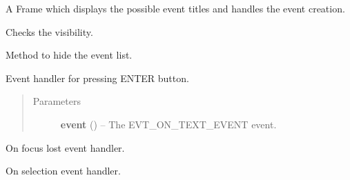\documentclass[letterpaper,10pt,english]{sphinxmanual}
\begin{document}
\begin{fulllineitems}
\label{diwacs:diwacs.EventList}
A Frame which displays the possible event titles and handles the event
creation.

\begin{fulllineitems}
\label{diwacs:diwacs.EventList.CheckVisibility}
Checks the visibility.

\end{fulllineitems}


\begin{fulllineitems}
\label{diwacs:diwacs.EventList.HideNow}
Method to hide the event list.

\end{fulllineitems}


\begin{fulllineitems}
\label{diwacs:diwacs.EventList.OnEnter}
Event handler for pressing ENTER button.
\begin{quote}\begin{description}
\item[{Parameters}] \leavevmode
\textbf{event} () -- The EVT\_ON\_TEXT\_EVENT event.

\end{description}\end{quote}

\end{fulllineitems}


\begin{fulllineitems}
\label{diwacs:diwacs.EventList.OnFocusLost}
On focus lost event handler.

\end{fulllineitems}


\begin{fulllineitems}
\label{diwacs:diwacs.EventList.OnSelection}
On selection event handler.


\end{fulllineitems}
\end{fulllineitems}
\end{document}
